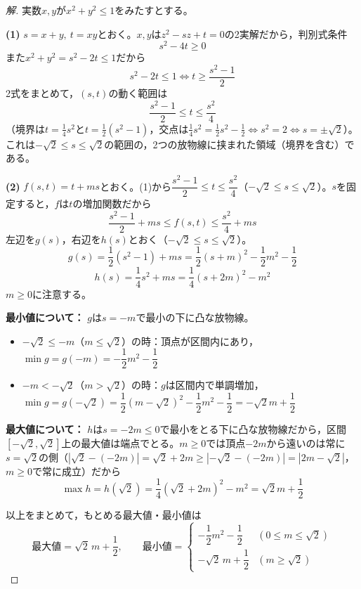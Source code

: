\documentclass[../main.tex]{subfiles}
\begin{document}
\begin{proof}[解]
  実数$x,y$が$x^2+y^2\le1$をみたすとする。

  \textbf{(1)} $s=x+y,\ t=xy$とおく。$x,y$は$z^2-sz+t=0$の2実解だから，判別式条件
  \[
    s^2-4t\ge0
  \]
  また$x^2+y^2=s^2-2t\le1$だから
  \[
    s^2-2t\le1 \iff t\ge\frac{s^2-1}2
  \]
  2式をまとめて，$(s,t)$の動く範囲は
  \[
    \frac{s^2-1}2\le t\le\frac{s^2}4
  \]
  （境界は$t=\frac14s^2$と$t=\frac12(s^2-1)$，交点は$\frac14s^2=\frac12s^2-\frac12\iff s^2=2\iff s=\pm\sqrt2$）。これは$-\sqrt2\le s\le\sqrt2$の範囲の，2つの放物線に挟まれた領域（境界を含む）である。

  \textbf{(2)} $f(s,t)=t+ms$とおく。(1)から$\dfrac{s^2-1}2\le t\le\dfrac{s^2}4$（$-\sqrt2\le s\le\sqrt2$）。$s$を固定すると，$f$は$t$の増加関数だから
  \[
    \frac{s^2-1}2+ms\le f(s,t)\le\frac{s^2}4+ms
  \]
  左辺を$g(s)$，右辺を$h(s)$とおく（$-\sqrt2\le s\le\sqrt2$）。
  \[
    g(s)=\frac12(s^2-1)+ms=\frac12(s+m)^2-\frac12m^2-\frac12
  \]
  \[
    h(s)=\frac14s^2+ms=\frac14(s+2m)^2-m^2
  \]
  $m\ge0$に注意する。

  \textbf{最小値について：} $g$は$s=-m$で最小の下に凸な放物線。
  \begin{itemize}
    \item $-\sqrt2\le-m$（$m\le\sqrt2$）の時：頂点が区間内にあり，$\min g=g(-m)=-\dfrac12m^2-\dfrac12$
    \item $-m<-\sqrt2$（$m>\sqrt2$）の時：$g$は区間内で単調増加，$\min g=g(-\sqrt2)=\dfrac12(m-\sqrt2)^2-\dfrac12m^2-\dfrac12=-\sqrt2m+\dfrac12$
  \end{itemize}

  \textbf{最大値について：} $h$は$s=-2m\le0$で最小をとる下に凸な放物線だから，区間$[-\sqrt2,\sqrt2]$上の最大値は端点でとる。$m\ge0$では頂点$-2m$から遠いのは常に$s=\sqrt2$の側（$|\sqrt2-(-2m)|=\sqrt2+2m\ge|-\sqrt2-(-2m)|=|2m-\sqrt2|$，$m\ge0$で常に成立）だから
  \[
    \max h=h(\sqrt2)=\frac14(\sqrt2+2m)^2-m^2=\sqrt2m+\frac12
  \]

  以上をまとめて，もとめる最大値・最小値は
  \[
    \text{最大値}=\sqrt2\,m+\frac12,\qquad
    \text{最小値}=
    \begin{cases}
      -\dfrac12m^2-\dfrac12 & (0\le m\le\sqrt2)\\[2mm]
      -\sqrt2\,m+\dfrac12 & (m\ge\sqrt2)
    \end{cases}
  \]
\end{proof}
\end{document}
